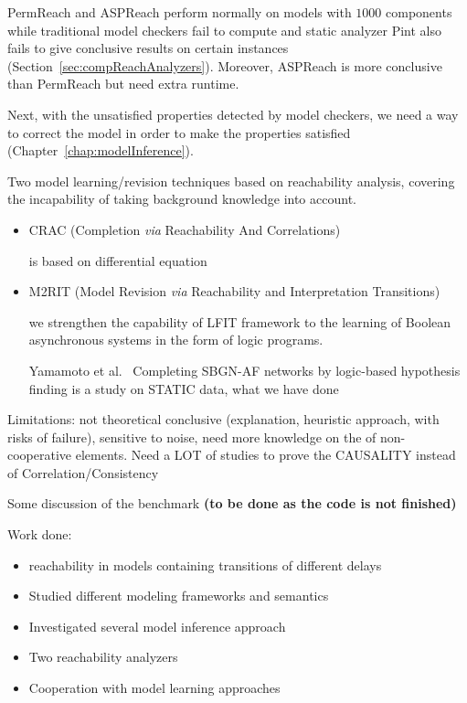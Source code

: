 PermReach and ASPReach perform normally on models with $1000$ components while traditional model checkers fail to compute and static analyzer Pint also fails to give conclusive results on certain instances (Section~\ref{sec:compReachAnalyzers}).
Moreover, ASPReach is more conclusive than PermReach but need extra runtime.

Next, with the unsatisfied properties detected by model checkers, we need a way to correct the model in order to make the properties satisfied (Chapter~\ref{chap:modelInference}).

Two model learning/revision techniques based on reachability analysis, covering the incapability of taking background knowledge into account.
\begin{itemize}
    \item CRAC (Completion \textit{via} Reachability And Correlations)
        
        is based on differential equation
    \item M2RIT (Model Revision \textit{via} Reachability and Interpretation Transitions)
    
    we strengthen the capability of LFIT framework to the learning of Boolean asynchronous systems in the form of logic programs.
    
    Yamamoto et al.~\cite{yamamoto2014completing} Completing SBGN-AF networks by logic-based hypothesis finding is a study on STATIC data, what we have done
\end{itemize}


Limitations: not theoretical conclusive (explanation, heuristic approach, with risks of failure), sensitive to noise, need more knowledge on the of non-cooperative elements.
Need a LOT of studies to prove the CAUSALITY instead of Correlation/Consistency

Some discussion of the benchmark \textbf{(to be done as the code is not finished)}

Work done:

\begin{itemize}
    \item reachability in models containing transitions of different delays
    \item Studied different modeling frameworks and semantics
    \item Investigated several model inference approach
    \item Two reachability analyzers
    \item Cooperation with model learning approaches
\end{itemize}

